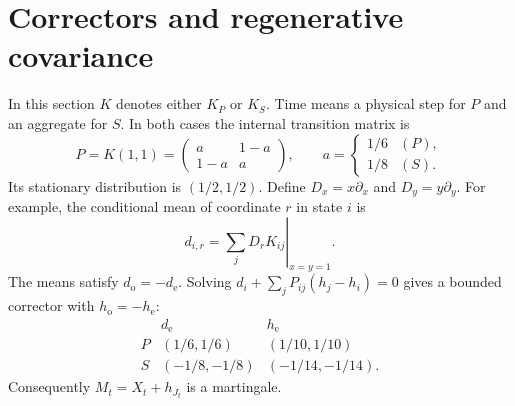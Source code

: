 \documentclass[11pt,letterpaper]{article}
\numberwithin{equation}{section}
\theoremstyle{remark}\newtheorem{remark}[theorem]{Remark}
\newcommand{\e}{\mathrm e}
\newcommand{\oState}{\mathrm o}
\begin{document}
\section{Correctors and regenerative covariance}\label{cps:sec:moments}
In this section $K$ denotes either $K_P$ or $K_S$. Time means a physical step for $P$ and an aggregate for $S$. In both cases the internal transition matrix is
\begin{equation}\label{cps:eq:internal}
 P=K(1,1)=\begin{pmatrix}a&1-a\\1-a&a\end{pmatrix},\qquad
 a=\begin{cases}1/6&(P),\\1/8&(S).
 \end{cases}
\end{equation}
Its stationary distribution is $(1/2,1/2)$. Define $D_x=x\partial_x$ and $D_y=y\partial_y$. For example, the conditional mean of coordinate $r$ in state $i$ is
\begin{equation}
 d_{i,r}=\left.\sum_jD_rK_{ij}\right|_{x=y=1}.
\end{equation}
The means satisfy $d_{\oState}=-d_{\e}$. Solving
$d_i+\sum_jP_{ij}(h_j-h_i)=0$ gives a bounded corrector with $h_{\oState}=-h_{\e}$:
\begin{equation}\label{cps:eq:drifts}
 \begin{array}{c|cc}
 &d_{\e}&h_{\e}\\ \hline
 P&(1/6,1/6)&(1/10,1/10)\\
 S&(-1/8,-1/8)&(-1/14,-1/14).
 \end{array}
\end{equation}
Consequently $M_t=X_t+h_{J_t}$ is a martingale.
\end{document}
